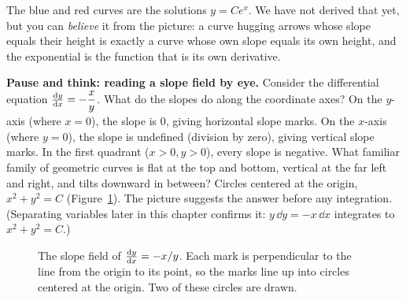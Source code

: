 The blue and red curves are the solutions $y = Ce^{x}$. We have not derived that
yet, but you can \emph{believe} it from the picture: a curve hugging arrows whose
slope equals their height is exactly a curve whose own slope equals its own height,
and the exponential is the function that is its own derivative.

\begin{recoverybox}
\textbf{Pause and think: reading a slope field by eye.}
Consider the differential equation $\frac{\mathrm{d} y}{\mathrm{d} x} = -\dfrac{x}{y}$. What do the slopes
do along the coordinate axes? On the $y$-axis (where $x=0$), the slope is $0$,
giving horizontal slope marks. On the $x$-axis (where $y=0$), the slope is
undefined (division by zero), giving vertical slope marks. In the first quadrant
($x>0, y>0$), every slope is negative. What familiar family of geometric curves
is flat at the top and bottom, vertical at the far left and right, and tilts
downward in between? Circles centered at the origin, $x^2 + y^2 = C$
(Figure~\ref{ch37:fig-circles-field}). The picture suggests the answer before
any integration. (Separating variables later in this chapter confirms it:
$y\,\dd y = -x\,\dd x$ integrates to $x^2+y^2=C$.)
\end{recoverybox}

\begin{figure}[htbp]
\centering
{}
\caption{The slope field of $\frac{\mathrm{d} y}{\mathrm{d} x}=-x/y$. Each mark is perpendicular to the
line from the origin to its point, so the marks line up into circles centered at
the origin. Two of these circles are drawn.}
\label{ch37:fig-circles-field}
\end{figure}

